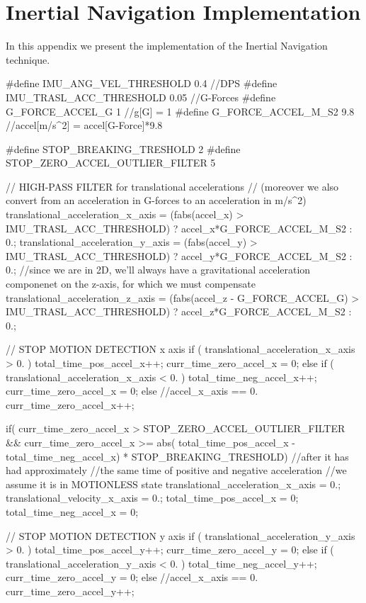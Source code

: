 \chapter{Inertial Navigation Implementation}\label{inert_nav_implementation}

In this appendix we present the implementation of the Inertial Navigation technique.

\begin{ccode}
	#define IMU_ANG_VEL_THRESHOLD 0.4 //DPS
	#define IMU_TRASL_ACC_THRESHOLD 0.05 //G-Forces
	#define G_FORCE_ACCEL_G 1 //g[G] = 1
	#define G_FORCE_ACCEL_M_S2 9.8 //accel[m/s^2] = accel[G-Force]*9.8

	#define STOP_BREAKING_TRESHOLD 2
	#define STOP_ZERO_ACCEL_OUTLIER_FILTER 5
	
	// HIGH-PASS FILTER for translational accelerations
		// (moreover we also convert from an acceleration in G-forces to an acceleration in m/s^2)
	translational_acceleration_x_axis = (fabs(accel_x) > IMU_TRASL_ACC_THRESHOLD) ? accel_x*G_FORCE_ACCEL_M_S2 : 0.;
	translational_acceleration_y_axis = (fabs(accel_y) > IMU_TRASL_ACC_THRESHOLD) ? accel_y*G_FORCE_ACCEL_M_S2 : 0.;
		//since we are in 2D, we'll always have a gravitational acceleration componenet on the z-axis, for which we must compensate
	translational_acceleration_z_axis = (fabs(accel_z - G_FORCE_ACCEL_G) > IMU_TRASL_ACC_THRESHOLD) ? accel_z*G_FORCE_ACCEL_M_S2 : 0.;
	
	// STOP MOTION DETECTION x axis
	if ( translational_acceleration_x_axis > 0. ) {
		total_time_pos_accel_x++;
		curr_time_zero_accel_x = 0;
	} else if ( translational_acceleration_x_axis < 0. ) {
		total_time_neg_accel_x++;
		curr_time_zero_accel_x = 0;
	} else //accel_x_axis == 0.
		curr_time_zero_accel_x++;	
	
	if( curr_time_zero_accel_x > STOP_ZERO_ACCEL_OUTLIER_FILTER && curr_time_zero_accel_x >= abs( total_time_pos_accel_x - total_time_neg_accel_x) * STOP_BREAKING_TRESHOLD) {
		//after it has had approximately
			//the same time of positive and negative acceleration
			//we assume it is in MOTIONLESS state
		translational_acceleration_x_axis = 0.;
		translational_velocity_x_axis = 0.;
		total_time_pos_accel_x = 0;
		total_time_neg_accel_x = 0;
	}
	
	// STOP MOTION DETECTION y axis
	if ( translational_acceleration_y_axis > 0. ) {
		total_time_pos_accel_y++;
		curr_time_zero_accel_y = 0;
	} else if ( translational_acceleration_y_axis < 0. ) {
		total_time_neg_accel_y++;
		curr_time_zero_accel_y = 0;
	} else //accel_x_axis == 0.
		curr_time_zero_accel_y++;	
	

\end{ccode}
